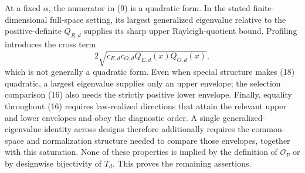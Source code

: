 At a fixed \(\alpha\), the numerator in (9) is a quadratic form.  In the stated finite-dimensional full-space setting, its largest generalized eigenvalue relative to the positive-definite \(Q_{R,d}\) supplies its sharp upper Rayleigh-quotient bound.  Profiling introduces the cross term
\[
 2\sqrt{c_{E,d}c_{O,d}Q_{E,d}(x)Q_{O,d}(x)},               \tag{18}
\]
which is not generally a quadratic form.  Even when special structure makes (18) quadratic, a largest eigenvalue supplies only an upper envelope; the selection comparison (16) also needs the strictly positive lower envelope.  Finally, equality throughout (16) requires law-realized directions that attain the relevant upper and lower envelopes and obey the diagnostic order.  A single generalized-eigenvalue identity across designs therefore additionally requires the common-space and normalization structure needed to compare those envelopes, together with this saturation.  None of these properties is implied by the definition of \(\mathcal O_P\) or by designwise bijectivity of \(T_d\).  This proves the remaining assertions.